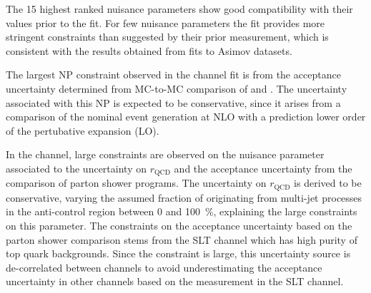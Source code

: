The 15 highest ranked nuisance parameters show good compatibility with
their values prior to the fit. For few nuisance parameters the fit
provides more stringent constraints than suggested by their prior
measurement, which is consistent with the results obtained from fits
to Asimov datasets.

The largest NP constraint observed in the \hadhad channel fit is from
the \ZHF acceptance uncertainty determined from MC-to-MC comparison of
\SHERPA and \MGNLOPY. The uncertainty associated with this NP is
expected to be conservative, since it arises from a comparison of the
nominal event generation at NLO with a prediction lower order of the
pertubative expansion (LO).

In the \lephad channel, large constraints are observed on the nuisance
parameter associated to the uncertainty on $r_{\text{QCD}}$ and the
\ttbar acceptance uncertainty from the comparison of parton shower
programs. The uncertainty on $r_{\text{QCD}}$ is derived to be
conservative, varying the assumed fraction of \faketauhadvis
originating from multi-jet processes in the anti-\tauhadvis control
region between 0 and \SI{100}{\percent}, explaining the large
constraints on this parameter. The constraints on the \ttbar
acceptance uncertainty based on the parton shower comparison stems
from the \lephad SLT channel which has high purity of top quark
backgrounds. Since the constraint is large, this uncertainty source is
de-correlated between channels to avoid underestimating the acceptance
uncertainty in other channels based on the measurement in the \lephad
SLT channel.

